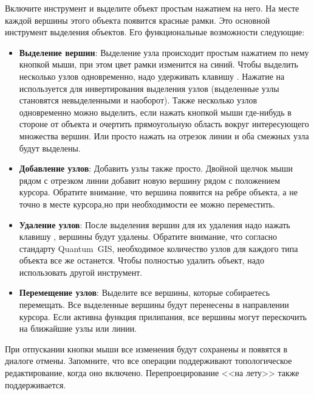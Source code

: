 
Включите инструмент  и
выделите объект простым нажатием на него. На месте каждой вершины этого
объекта появится красные рамки. Это основной инструмент выделения объектов.
Его функциональные возможности следующие:

\begin{itemize}[label=--]
\item \textbf{Выделение вершин}: Выделение узла происходит простым нажатием
по нему кнопкой мыши, при этом цвет рамки изменится на синий. Чтобы выделить
несколько узлов одновременно, надо удерживать клавишу
. Нажатие на
 используется для инвертирования выделения узлов (выделенные
узлы становятся невыделенными и наоборот). Также несколько узлов одновременно
можно выделить, если нажать кнопкой мыши где-нибудь в стороне от объекта и
очертить прямоугольную область вокруг интересующего множества вершин. Или
просто нажать на отрезок линии и оба смежных узла будут выделены.
\item \textbf{Добавление узлов}: Добавить узлы также просто. Двойной щелчок
мыши рядом с отрезком линии добавит новую вершину рядом с положением курсора.
Обратите внимание, что вершина появится на ребре объекта, а не точно в
месте курсора,но при необходимости ее можно переместить.
\item \textbf{Удаление узлов}: После выделения вершин для их удаления надо
нажать клавишу , вершины будут удалены. Обратите внимание,
что согласно стандарту Quantum~GIS, необходимое количество узлов для каждого
типа объекта все же останется. Чтобы полностью удалить объект, надо использовать
другой инструмент.
\item \textbf{Перемещение узлов}: Выделите все вершины, которые собираетесь
перемещать. Все выделенные вершины будут перенесены в направлении курсора.
Если активна функция прилипания, все вершины могут перескочить на
ближайшие узлы или линии.
\end{itemize}

При отпускании кнопки мыши все изменения будут сохранены и появятся в
диалоге отмены. Запомните, что все операции поддерживают топологическое
редактирование, когда оно включено. Перепроецирование <<на лету>> также
поддерживается.


